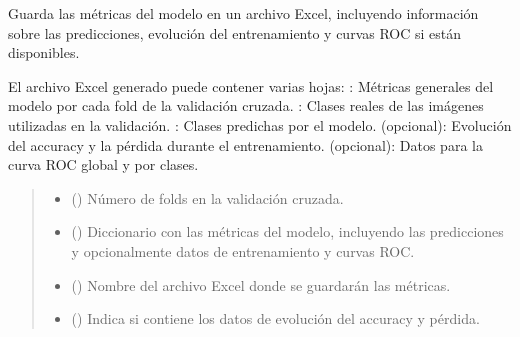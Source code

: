 \documentclass[letterpaper,10pt,spanish]{sphinxmanual}
\begin{document}
\begin{fulllineitems}
\label{\detokenize{Funciones_Generales:guardar_metricas.guardar_metricas}}
\pysigstartsignatures
\pysiglinewithargsret
{}
{\sphinxparamcomma {}\sphinxparamcomma {}\sphinxparamcomma {}\sphinxparamcomma {}\sphinxparamcomma {}}
{}
\pysigstopsignatures
\sphinxAtStartPar
Guarda las métricas del modelo en un archivo Excel, incluyendo información sobre las predicciones, 
evolución del entrenamiento y curvas ROC si están disponibles.

\sphinxAtStartPar
El archivo Excel generado puede contener varias hojas:
\sphinxhyphen{} : Métricas generales del modelo por cada fold de la validación cruzada.
\sphinxhyphen{} : Clases reales de las imágenes utilizadas en la validación.
\sphinxhyphen{} : Clases predichas por el modelo.
\sphinxhyphen{}  (opcional): Evolución del accuracy y la pérdida durante el entrenamiento.
\sphinxhyphen{}  (opcional): Datos para la curva ROC global y por clases.
\begin{quote}\begin{description}
\begin{itemize}
\item {} 
\sphinxAtStartPar
{} () \textendash{} Número de folds en la validación cruzada.

\item {} 
\sphinxAtStartPar
{} () \textendash{} Diccionario con las métricas del modelo, incluyendo las predicciones y opcionalmente 
datos de entrenamiento y curvas ROC.

\item {} 
\sphinxAtStartPar
{} () \textendash{} Nombre del archivo Excel donde se guardarán las métricas.

\item {} 
\sphinxAtStartPar
{} () \textendash{} Indica si  contiene los datos de evolución del accuracy y pérdida.


\end{itemize}
\end{description}
\end{quote}
\end{fulllineitems}
\end{document}
